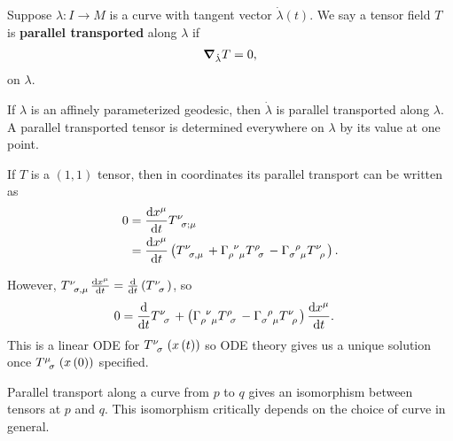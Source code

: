 Suppose $\lambda : I \to M$ is a curve with tangent vector $\dot{\lambda}\left( t \right) $. We say a tensor field $T$ is \textbf{parallel transported} along $\lambda$ if
\begin{align}
    \grad_{\dot{\lambda}} T = 0
,\end{align}
on $\lambda$.

If $\lambda$ is an affinely parameterized geodesic, then $\dot{\lambda}$ is parallel transported along $\lambda$. A parallel transported tensor is determined everywhere on $\lambda$ by its value at one point. 

\begin{example}
    If $T$ is a $\left( 1,1 \right) $ tensor, then in coordinates its parallel transport can be written as
    \begin{align}
        0 &= \dv{x^{\mu}}{t} \tensor{T}{^{\nu}_{\sigma ; \mu}} \\
        &= \dv{x^{\mu}}{t} \left( \tensor{T}{^{\nu}_{\sigma, \mu}} + \tensor{\Gamma}{_{\rho}^{\nu}_{\mu}} \tensor{T}{^{\rho}_\sigma} - \tensor{\Gamma}{_{\sigma}^{\rho}_\mu} \tensor{T}{^{\nu}_\rho} \right)
    .\end{align}

    However, $\tensor{T}{^{\nu}_{\sigma , \mu}} \dv{x^{\mu}}{t} = \dv{t} \left( \tensor{T}{^{\nu}_{\sigma}} \right) $, so 
    \begin{align}
       0 &= \dv{t} \tensor{T}{^{\nu}_{\sigma}} + \left( \tensor{\Gamma}{_{\rho}^{\nu}_{\mu}} \tensor{T}{^{\rho}_\sigma} - \tensor{\Gamma}{_{\sigma}^{\rho}_\mu} \tensor{T}{^{\nu}_\rho} \right)  \dv{x^{\mu}}{t}
    .\end{align}
    This is a linear ODE for $\tensor{T}{^{\nu}_{\sigma}}\left( x \left( t \right)  \right) $ so ODE theory gives us a unique solution once $\tensor{T}{^{\mu}_{\sigma}}\left( x \left( 0 \right)  \right) $ specified.
\end{example}

Parallel transport along a curve from $p$ to $q$ gives an isomorphism between tensors at $p$ and $q$. This isomorphism critically depends on the choice of curve in general.







